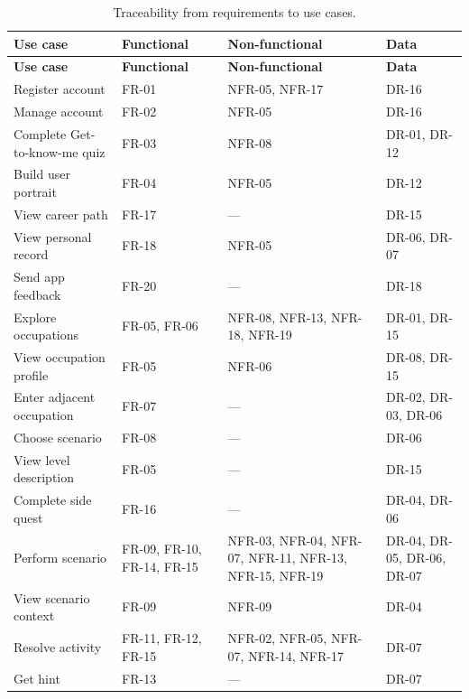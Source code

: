 {\small
\begin{longtable}{|>{\raggedright\arraybackslash}p{}|>{\raggedright\arraybackslash}p{}|>{\raggedright\arraybackslash}p{}|>{\raggedright\arraybackslash}p{}|}
\caption{Traceability from requirements to use cases.} \\
\hline
\textbf{Use case} & \textbf{Functional} & \textbf{Non-functional} & \textbf{Data} \\ \hline
\endfirsthead
\hline
\textbf{Use case} & \textbf{Functional} & \textbf{Non-functional} & \textbf{Data} \\ \hline
\endhead
Register account & FR-01 & NFR-05, NFR-17 & DR-16 \\ \hline
Manage account & FR-02 & NFR-05 & DR-16 \\ \hline
Complete Get-to-know-me quiz & FR-03 & NFR-08 & DR-01, DR-12 \\ \hline
Build user portrait & FR-04 & NFR-05 & DR-12 \\ \hline
View career path & FR-17 & --- & DR-15 \\ \hline
View personal record & FR-18 & NFR-05 & DR-06, DR-07 \\ \hline
Send app feedback & FR-20 & --- & DR-18 \\ \hline
Explore occupations & FR-05, FR-06 & NFR-08, NFR-13, NFR-18, NFR-19 & DR-01, DR-15 \\ \hline
View occupation profile & FR-05 & NFR-06 & DR-08, DR-15 \\ \hline
Enter adjacent occupation & FR-07 & --- & DR-02, DR-03, DR-06 \\ \hline
Choose scenario & FR-08 & --- & DR-06 \\ \hline
View level description & FR-05 & --- & DR-15 \\ \hline
Complete side quest & FR-16 & --- & DR-04, DR-06 \\ \hline
Perform scenario & FR-09, FR-10, FR-14, FR-15 & NFR-03, NFR-04, NFR-07, NFR-11, NFR-13, NFR-15, NFR-19 & DR-04, DR-05, DR-06, DR-07 \\ \hline
View scenario context & FR-09 & NFR-09 & DR-04 \\ \hline
Resolve activity & FR-11, FR-12, FR-15 & NFR-02, NFR-05, NFR-07, NFR-14, NFR-17 & DR-07 \\ \hline
Get hint & FR-13 & --- & DR-07 \\ \hline

\end{longtable}}
